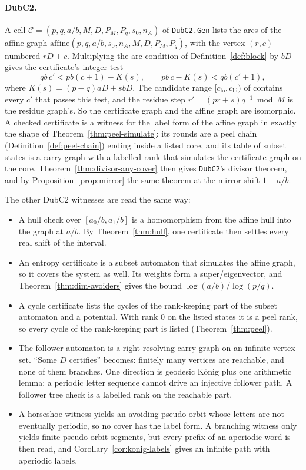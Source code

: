 \paragraph{DubC2.} A cell \(\mathcal C=(p,q,a/b,M,D,P_M,P_q,s_0,n_A)\) of \texttt{DubC2.Gen} lists
the arcs of the affine graph \(\mathrm{affine}(p,q,a/b,s_0,n_A,M,D,P_M,P_q)\), with the vertex
\((r,c)\) numbered \(rD+c\). Multiplying the arc condition of Definition~\ref{def:block} by
\(bD\) gives the certificate's integer test
\[
qb\,c'<pb(c+1)-K(s),\qquad pb\,c-K(s)<qb(c'+1),
\]
where \(K(s)=(p-q)aD+sbD\).
The candidate range \([c_{\mathrm{lo}},c_{\mathrm{hi}})\) of  contains every
\(c'\) that passes this test, and the residue step \(r'=(pr+s)q^{-1}\bmod M\) is the residue
graph's. So the certificate graph and the affine graph are isomorphic. A checked certificate
is a witness for the label form of the affine graph in exactly the shape of
Theorem~\ref{thm:peel-simulate}: its rounds are a peel chain (Definition~\ref{def:peel-chain})
ending inside a listed core, and its table of subset states is a carry graph with a labelled
rank that simulates the certificate graph on the core. Theorem~\ref{thm:divisor-any-cover} then
gives \texttt{DubC2}'s divisor theorem, and by Proposition~\ref{prop:mirror} the same theorem at
the mirror shift \(1-a/b\).

The other DubC2 witnesses are read the same way:
\begin{itemize}
\item A hull check over \([a_0/b,a_1/b]\) is a homomorphism from the affine hull into the graph
at \(a/b\). By Theorem~\ref{thm:hull}, one certificate then settles every real shift of the
interval.
\item An entropy certificate is a subset automaton that simulates the affine graph, so it covers
the system as well. Its weights form a super\-/eigenvector, and
Theorem~\ref{thm:dim-avoiders} gives the bound \(\log(a/b)/\log(p/q)\).
\item A cycle certificate lists the cycles of the rank-keeping part of the subset automaton
and a potential. With rank \(0\) on the listed states it is a peel rank, so every cycle of the
rank-keeping part is listed (Theorem~\ref{thm:peel}).
\item The follower automaton is a right-resolving carry graph on an infinite vertex set. ``Some
\(D\) certifies'' becomes: finitely many vertices are reachable, and none of them branches. One
direction is geodesic Kőnig plus one arithmetic lemma: a periodic letter sequence cannot drive
an injective follower path. A follower tree check is a labelled rank on the reachable part.
\item A horseshoe witness yields an avoiding pseudo-orbit whose letters are not eventually
periodic, so no cover has the label form. A branching witness only yields finite pseudo-orbit
segments, but every prefix of an aperiodic word is then read, and Corollary~\ref{cor:konig-labels}
gives an infinite path with aperiodic labels.
\end{itemize}

